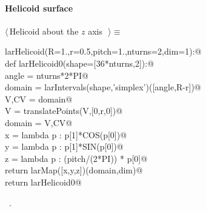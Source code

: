 \documentclass[11pt,oneside]{article}	%
\begin{document}
\paragraph{Helicoid surface}
\begin{flushleft} \small \label{scrap9}
$\langle\,$Helicoid about the $z$ axis\nobreak\ {\footnotesize {}}$\,\rangle\equiv$
\vspace{-1ex}
\begin{list}{}{} \item
\mbox{}\verb@def larHelicoid(R=1.,r=0.5,pitch=1.,nturns=2,dim=1):@\\
\mbox{}\verb@   def larHelicoid0(shape=[36*nturns,2]):@\\
\mbox{}\verb@      angle = nturns*2*PI@\\
\mbox{}\verb@      domain = larIntervals(shape,'simplex')([angle,R-r])@\\
\mbox{}\verb@      V,CV = domain@\\
\mbox{}\verb@      V = translatePoints(V,[0,r,0])@\\
\mbox{}\verb@      domain = V,CV@\\
\mbox{}\verb@      x = lambda p : p[1]*COS(p[0])@\\
\mbox{}\verb@      y = lambda p : p[1]*SIN(p[0])@\\
\mbox{}\verb@      z = lambda p : (pitch/(2*PI)) * p[0]@\\
\mbox{}\verb@      return larMap([x,y,z])(domain,dim)@\\
\mbox{}\verb@   return larHelicoid0@\\
\mbox{}\verb@@{\NWsep}
\end{list}
\vspace{-1ex}
\footnotesize\addtolength{\baselineskip}{-1ex}
\begin{list}{}{\setlength{\itemsep}{-\parsep}\setlength{\itemindent}{-\leftmargin}}
\item \NWtxtMacroRefIn\ .
\end{list}
\end{flushleft}
\end{document}
